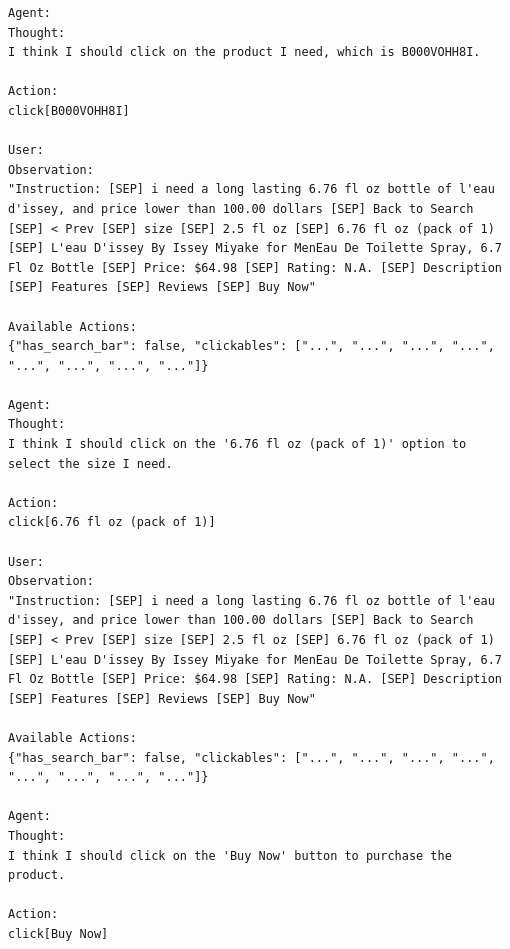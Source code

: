 \begin{lstlisting}
Agent:
Thought:
I think I should click on the product I need, which is B000VOHH8I.

Action:
click[B000VOHH8I]

User:
Observation:
"Instruction: [SEP] i need a long lasting 6.76 fl oz bottle of l'eau d'issey, and price lower than 100.00 dollars [SEP] Back to Search [SEP] < Prev [SEP] size [SEP] 2.5 fl oz [SEP] 6.76 fl oz (pack of 1) [SEP] L'eau D'issey By Issey Miyake for MenEau De Toilette Spray, 6.7 Fl Oz Bottle [SEP] Price: $64.98 [SEP] Rating: N.A. [SEP] Description [SEP] Features [SEP] Reviews [SEP] Buy Now"

Available Actions:
{"has_search_bar": false, "clickables": ["...", "...", "...", "...", "...", "...", "...", "..."]}

Agent:
Thought:
I think I should click on the '6.76 fl oz (pack of 1)' option to select the size I need.

Action:
click[6.76 fl oz (pack of 1)]

User:
Observation:
"Instruction: [SEP] i need a long lasting 6.76 fl oz bottle of l'eau d'issey, and price lower than 100.00 dollars [SEP] Back to Search [SEP] < Prev [SEP] size [SEP] 2.5 fl oz [SEP] 6.76 fl oz (pack of 1) [SEP] L'eau D'issey By Issey Miyake for MenEau De Toilette Spray, 6.7 Fl Oz Bottle [SEP] Price: $64.98 [SEP] Rating: N.A. [SEP] Description [SEP] Features [SEP] Reviews [SEP] Buy Now"

Available Actions:
{"has_search_bar": false, "clickables": ["...", "...", "...", "...", "...", "...", "...", "..."]}

Agent:
Thought:
I think I should click on the 'Buy Now' button to purchase the product.

Action:
click[Buy Now]
\end{lstlisting}
